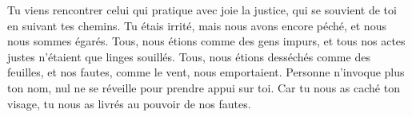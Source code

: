 Tu viens rencontrer celui qui pratique avec joie la justice,
	qui se souvient de toi en suivant tes chemins.
Tu étais irrité, mais nous avons encore péché, et nous nous sommes égarés.
Tous, nous étions comme des gens impurs,
	et tous nos actes justes n’étaient que linges souillés.
Tous, nous étions desséchés comme des feuilles,
	et nos fautes, comme le vent, nous emportaient.
Personne n’invoque plus ton nom, nul ne se réveille pour prendre appui sur toi.
	Car tu nous as caché ton visage, tu nous as livrés au pouvoir de nos fautes.
